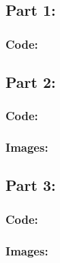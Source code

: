 \documentclass[a4paper]{article}
\begin{document}
	\subsection{Part 1:}
	\subsubsection{Code:}
	\subsection{Part 2:}
	\subsubsection{Code:}
	\subsubsection{Images:}
	\subsection{Part 3:}
	\subsubsection{Code:}
	\subsubsection{Images:}
\end{document}
